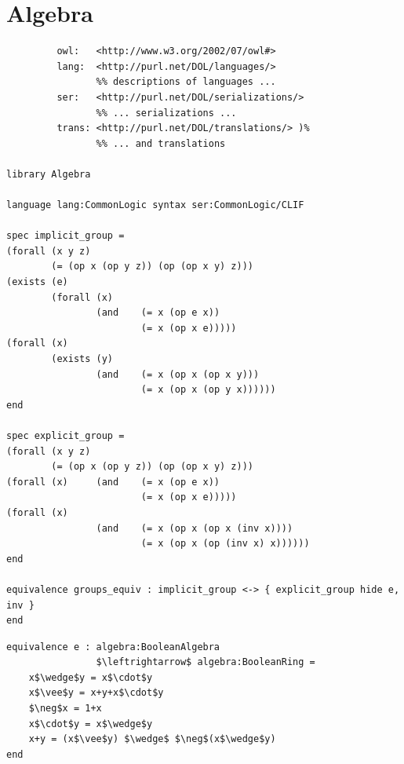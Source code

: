\documentclass[10pt,fleqn,final]{scrreprt}
\newcommand{\sclause}[1]{\section{#1}}
\begin{document}
\sclause{Algebra}


\begin{lstlisting}[basicstyle=\ttfamily,language=dolText,morekeywords={props,ObjectProperty,Class,DisjointUnionOf,SubClassOf,Characteristics,Transitive,Asymmetric,SubPropertyOf,DisjointClasses,EquivalentTo,inverse,only,forall,iff,if,or,exists,distributed,equivalence},escapechar=@,mathescape]
%prefix( :      <http://www.example.org/alignment#>
         owl:   <http://www.w3.org/2002/07/owl#>
         lang:  <http://purl.net/DOL/languages/>
                %% descriptions of languages ...
         ser:   <http://purl.net/DOL/serializations/>
                %% ... serializations ...
         trans: <http://purl.net/DOL/translations/> )%
                %% ... and translations

library Algebra

language lang:CommonLogic syntax ser:CommonLogic/CLIF

spec implicit_group =
(forall (x y z)
        (= (op x (op y z)) (op (op x y) z)))
(exists (e)
        (forall (x)
                (and    (= x (op e x))
                        (= x (op x e)))))
(forall (x)
        (exists (y)
                (and    (= x (op x (op x y)))
                        (= x (op x (op y x))))))
end

spec explicit_group =
(forall (x y z)
        (= (op x (op y z)) (op (op x y) z)))
(forall (x)     (and    (= x (op e x))
                        (= x (op x e)))))
(forall (x)
                (and    (= x (op x (op x (inv x))))
                        (= x (op x (op (inv x) x))))))
end

equivalence groups_equiv : implicit_group <-> { explicit_group hide e, inv }
end
\end{lstlisting}

\begin{lstlisting}[basicstyle=\ttfamily,language=dolText,morekeywords={props,ObjectProperty,Class,DisjointUnionOf,SubClassOf,Characteristics,Transitive,Asymmetric,SubPropertyOf,DisjointClasses,EquivalentTo,inverse,only,forall,iff,if,or,exists,sort,ops,in,approximate,extract,equivalence,spec},escapechar=@,mathescape]
equivalence e : algebra:BooleanAlgebra
                $\leftrightarrow$ algebra:BooleanRing =
    x$\wedge$y = x$\cdot$y
    x$\vee$y = x+y+x$\cdot$y
    $\neg$x = 1+x
    x$\cdot$y = x$\wedge$y
    x+y = (x$\vee$y) $\wedge$ $\neg$(x$\wedge$y)
end
\end{lstlisting}
\end{document}
